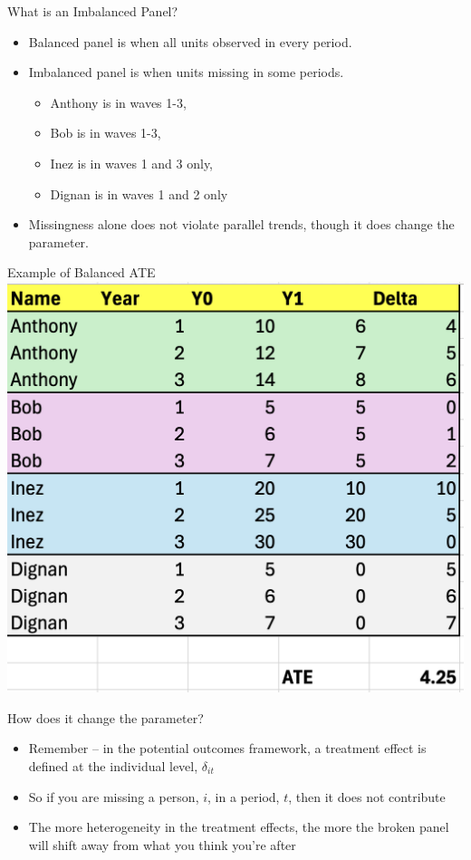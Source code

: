 \documentclass{beamer}
\begin{document}
\begin{frame}{What is an Imbalanced Panel?}
  \begin{itemize}
    \item Balanced panel is when all units observed in every period.
    \item Imbalanced panel is when units missing in some periods.
		\begin{itemize}
		\item Anthony is in waves 1-3, 
		\item Bob is in waves 1-3, 
		\item Inez is in waves 1 and 3 only, 
		\item Dignan is in waves 1 and 2 only
		\end{itemize}
    \item Missingness alone does not violate parallel trends, though it does change the parameter.
  \end{itemize}
\end{frame}

\begin{frame}{Example of Balanced ATE}
  \centering
  \includegraphics[height=0.85\textheight,keepaspectratio]{./lecture_includes/balanced.png}
\end{frame}


\begin{frame}{How does it change the parameter?}

\begin{itemize}
\item Remember -- in the potential outcomes framework, a treatment effect is defined at the individual level, $\delta_{it}$
\item So if you are missing a person, $i$,  in a period, $t$, then it does not contribute
\item The more heterogeneity in the treatment effects, the more the broken panel will shift away from what you think you're after
\end{itemize}

\end{frame}
\end{document}
